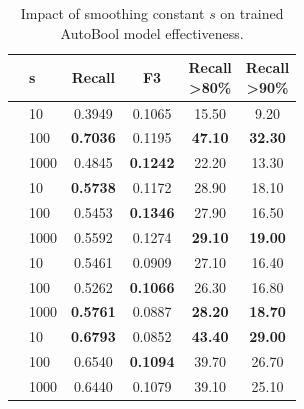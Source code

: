 \begin{table}[t]
	\small
	\centering
	\caption{Impact of smoothing constant $s$ on trained AutoBool model effectiveness.}
	\label{tab:eval-results-scale-values}

	\begin{tabular}{llcccc}
		\toprule
		 & s & Recall & F3 & \parbox{2.5em}{Recall\\>80\%}  & \parbox{2.5em}{Recall\\>90\%} \\
		\midrule
		 & 10 & 0.3949 & 0.1065 & 15.50 & 9.20 \\
		& 100 & \textbf{0.7036} & 0.1195 & \textbf{47.10} & \textbf{32.30} \\
		& 1000 & 0.4845 & \textbf{0.1242} & 22.20 & 13.30 \\
		\midrule
		 & 10 & \textbf{0.5738} & 0.1172 & 28.90 & 18.10 \\
		& 100 & 0.5453 & \textbf{0.1346} & 27.90 & 16.50 \\
		& 1000 & 0.5592 & 0.1274 & \textbf{29.10} & \textbf{19.00} \\
		\midrule
		 & 10 & 0.5461 & 0.0909 & 27.10 & 16.40 \\
		& 100 & 0.5262 & \textbf{0.1066} & 26.30 & 16.80 \\
		& 1000 & \textbf{0.5761} & 0.0887 & \textbf{28.20} & \textbf{18.70} \\
		\midrule
		 & 10 & \textbf{0.6793} & 0.0852 & \textbf{43.40} & \textbf{29.00} \\
		& 100 & 0.6540 & \textbf{0.1094} & 39.70 & 26.70 \\
		& 1000 & 0.6440 & 0.1079 & 39.10 & 25.10 \\ \bottomrule
		
	\end{tabular}

\end{table}
